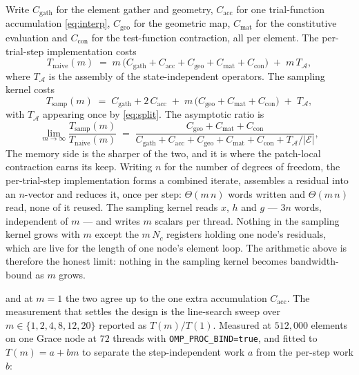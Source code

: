 \documentclass[11pt]{article}
\begin{document}
Write $C_{\text{gath}}$ for the element gather and geometry, $C_{\text{acc}}$ for
one trial-function accumulation \eqref{eq:interp}, $C_{\text{geo}}$ for the
geometric map, $C_{\text{mat}}$ for the constitutive evaluation and
$C_{\text{con}}$ for the test-function contraction, all per element.  The
per-trial-step implementation costs
\begin{equation}
  T_{\text{naive}}(m) \;=\; m\,\bigl(C_{\text{gath}} + C_{\text{acc}}
  + C_{\text{geo}} + C_{\text{mat}} + C_{\text{con}}\bigr)
  \;+\; m\,T_{\mathcal{A}},
\end{equation}
where $T_{\mathcal{A}}$ is the assembly of the state-independent operators.  The
sampling kernel costs
\begin{equation}
  T_{\text{samp}}(m) \;=\; C_{\text{gath}} + 2\,C_{\text{acc}}
  \;+\; m\,\bigl(C_{\text{geo}} + C_{\text{mat}} + C_{\text{con}}\bigr)
  \;+\; T_{\mathcal{A}},
\end{equation}
with $T_{\mathcal{A}}$ appearing once by \eqref{eq:split}.  The asymptotic ratio is
\begin{equation}
  \lim_{m\to\infty}\frac{T_{\text{samp}}(m)}{T_{\text{naive}}(m)}
  \;=\;
  \frac{C_{\text{geo}} + C_{\text{mat}} + C_{\text{con}}}
       {C_{\text{gath}} + C_{\text{acc}} + C_{\text{geo}} + C_{\text{mat}} + C_{\text{con}} + T_{\mathcal{A}}/|\mathcal{E}|},
\end{equation}
The memory side is the sharper of the two, and it is where the patch-local
contraction earns its keep.  Writing $n$ for the number of degrees of freedom, the
per-trial-step implementation forms a combined iterate, assembles a residual into an
$n$-vector and reduces it, once per step: $\Theta(m\,n)$ words written and
$\Theta(m\,n)$ read, none of it reused.  The sampling kernel reads $x$, $h$ and $g$
--- $3n$ words, independent of $m$ --- and writes $m$ scalars per thread.  Nothing in the sampling kernel grows with $m$ except the
$m\,N_c$ registers holding one node's residuals, which are live for the length of
one node's element loop.  The arithmetic above is
therefore the honest limit: nothing in the sampling kernel becomes bandwidth-bound
as $m$ grows.

and at $m=1$ the two agree up to the one extra accumulation $C_{\text{acc}}$.  The
measurement that settles the design is the line-search sweep over
$m\in\{1,2,4,8,12,20\}$ reported as $T(m)/T(1)$.  Measured at $512{,}000$
elements on one Grace node at $72$ threads with \texttt{OMP\_PROC\_BIND=true},
and fitted to $T(m)=a+bm$ to separate the step-independent work $a$ from the
per-step work $b$:
\end{document}
